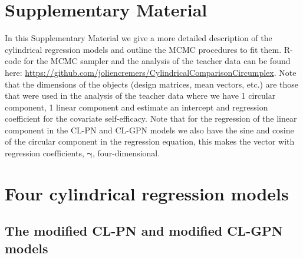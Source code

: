 \documentclass[12pt,]{article}
\title{}
\author{}
\date{}
\begin{document}
\section{Supplementary Material}\label{Appendix}

In this Supplementary Material we give a more detailed description of
the cylindrical regression models and outline the MCMC procedures to fit
them. R-code for the MCMC sampler and the analysis of the teacher data
can be found here:
\url{https://github.com/joliencremers/CylindricalComparisonCircumplex}.
Note that the dimensions of the objects (design matrices, mean vectors,
etc.) are those that were used in the analysis of the teacher data where
we have 1 circular component, 1 linear component and estimate an
intercept and regression coefficient for the covariate self-efficacy.
Note that for the regression of the linear component in the CL-PN and
CL-GPN models we also have the sine and cosine of the circular component
in the regression equation, this makes the vector with regression
coefficients, \(\boldsymbol{\gamma}\), four-dimensional.

\section{Four cylindrical regression models}\label{Models}

\subsection{The modified CL-PN and modified CL-GPN  models}\label{CL-(G)PN}
\end{document}
